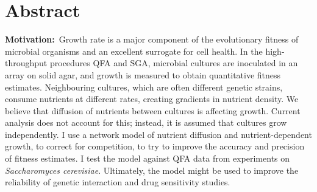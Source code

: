 \section*{Abstract}
\label{sec:abstract}


\textbf{Motivation:}~Growth rate is a major component of the
evolutionary fitness of microbial organisms and an excellent surrogate
for cell health.
In the high-throughput procedures QFA and SGA, microbial cultures are
inoculated in an array on solid agar, and growth is measured to obtain
quantitative fitness estimates.
%
%
Neighbouring cultures, which are often different genetic strains,
consume nutrients at different rates, creating gradients in nutrient
density. We believe that diffusion of nutrients between cultures is
affecting growth. Current analysis does not account for this; instead,
it is assumed that cultures grow independently. I use a network model
of nutrient diffusion and nutrient-dependent growth, to correct for
competition, to try to improve the accuracy and precision of fitness
estimates. I test the model against QFA data from experiments on
\textit{Saccharomyces cerevisiae}. Ultimately, the model might be used
to improve the reliability of genetic interaction and drug sensitivity
studies.
\\
